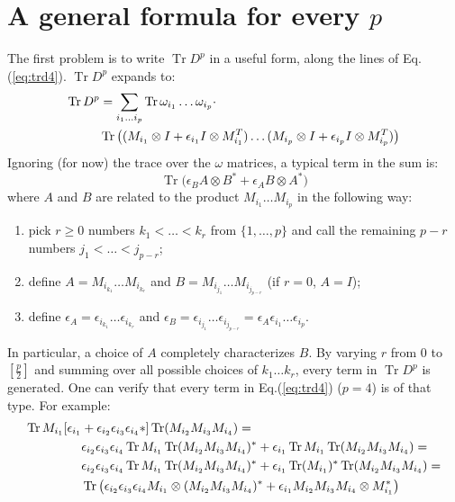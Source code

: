 \documentclass[12pt,a4paper]{article}
\DeclareMathOperator{\Tr}{Tr}
\begin{document}
\section{A general formula for every $p$}
The first problem is to write $\Tr D^p$ in a useful form, along the lines of Eq.(\ref{eq:trd4}).\newline
$\Tr D^p$ expands to:
\begin{align}
\Tr D^p &= \sum_{i_1 \ldots i_p} \Tr \omega_{i_1} \ldots \omega_{i_p} \cdot \notag \\
&\Tr \big( (M_{i_1} \otimes I + \epsilon_{i_1} I \otimes M_{i_1}^T) \ldots  (M_{i_p} \otimes I + \epsilon_{i_p} I \otimes M_{i_p}^T) \big)
\end{align}
Ignoring (for now) the trace over the $\omega$ matrices, a typical term in the sum is:
\begin{equation}\label{eq:typical}
\Tr \big( \epsilon_B A \otimes B^* + \epsilon_A B \otimes A^* \big)
\end{equation}
where $A$ and $B$ are related to the product $M_{i_1} \ldots M_{i_p}$ in the following way:
\begin{enumerate}
\item pick $r \geq 0$ numbers $k_1 < \ldots < k_r$ from $\{1, \ldots , p\}$ and call the remaining $p-r$ numbers $j_1 < \ldots < j_{p-r}$;
\item define $A = M_{i_{k_1}} \ldots M_{i_{k_r}}$ and $B = M_{i_{j_1}} \ldots M_{i_{j_{p-r}}}$ (if $r=0$, $A=I$);
\item define $\epsilon_A = \epsilon_{i_{k_1}} \ldots \epsilon_{i_{k_r}}$ and $\epsilon_B = \epsilon_{i_{j_1}} \ldots \epsilon_{i_{j_{p-r}}} = \epsilon_A \epsilon_{i_1} \ldots \epsilon_{i_p}$.
\end{enumerate}
In particular, a choice of $A$ completely characterizes $B$. \newline
By varying $r$ from $0$ to $\left[\frac{p}{2}\right]$ and summing over all possible choices of $k_1 \ldots k_r$, every term in $\Tr D^p$ is generated.\newline
One can verify that every term in Eq.(\ref{eq:trd4}) ($p=4$) is of that type. For example:
\begin{align}
\Tr M_{i_1} [\epsilon_{i_1} &+ \epsilon_{i_2} \epsilon_{i_3} \epsilon_{i_4} *] \Tr ( M_{i_2} M_{i_3} M_{i_4}) = \notag \\
&\epsilon_{i_2} \epsilon_{i_3} \epsilon_{i_4} \Tr M_{i_1} \Tr (M_{i_2} M_{i_3} M_{i_4})^* + \epsilon_{i_1} \Tr M_{i_1} \Tr ( M_{i_2} M_{i_3} M_{i_4}) = \notag \\
&\epsilon_{i_2} \epsilon_{i_3} \epsilon_{i_4} \Tr M_{i_1} \Tr (M_{i_2} M_{i_3} M_{i_4})^* + \epsilon_{i_1} \Tr (M_{i_1})^* \Tr ( M_{i_2} M_{i_3} M_{i_4}) = \notag \\
&\Tr \big( \epsilon_{i_2} \epsilon_{i_3} \epsilon_{i_4}  M_{i_1} \otimes (M_{i_2} M_{i_3} M_{i_4})^* + \epsilon_{i_1}  M_{i_2} M_{i_3} M_{i_4} \otimes M_{i_1}^*  \big)
\end{align}
\end{document}
